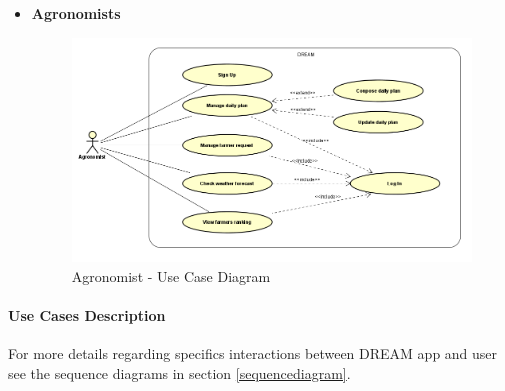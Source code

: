 \documentclass[table, 12pt]{article}
\begin{document}
\begin{itemize}
\begin{center}
    \end{center}
    \newpage
    \item \textbf {Agronomists}
    \begin{center}
        \begin{figure}[H]
            \includegraphics[scale=0.60, center]{assets/Use cases/UseCase_Agronomist.png}
            \caption{Agronomist - Use Case Diagram}
            \label{fig: UseCase_Agronomist}
        \end{figure}
    \end{center}
    \newpage
\end{itemize}

    \paragraph{Use Cases Description}

    For more details regarding specifics interactions between DREAM app and user see the sequence diagrams in section \ref{sequencediagram}.
    
\end{document}
